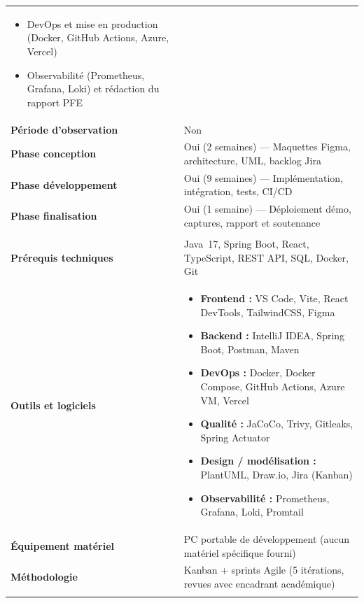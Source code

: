 {\begin{tabularx}{\textwidth}{@{}>{\bfseries\color{ficheblue}}L{4.2cm}X@{}}
\begin{itemize}[leftmargin=1.2em, nosep, topsep=2pt]
\item DevOps et mise en production (Docker, GitHub Actions, Azure, Vercel)
\item Observabilité (Prometheus, Grafana, Loki) et rédaction du rapport PFE
\end{itemize} \\
Période d'observation & Non \\
Phase conception & Oui (2 semaines) --- Maquettes Figma, architecture, UML, backlog Jira \\
Phase développement & Oui (9 semaines) --- Implémentation, intégration, tests, CI/CD \\
Phase finalisation & Oui (1 semaine) --- Déploiement démo, captures, rapport et soutenance \\
\midrule
{}
 \\
\midrule
{}
Prérequis techniques & Java~17, Spring Boot, React, TypeScript, REST API, SQL, Docker, Git \\
Outils et logiciels &
\begin{itemize}[leftmargin=1.2em, nosep, topsep=2pt]
\setlength{\itemsep}{1pt}
\item \textbf{Frontend :} VS Code, Vite, React DevTools, TailwindCSS, Figma
\item \textbf{Backend :} IntelliJ IDEA, Spring Boot, Postman, Maven
\item \textbf{DevOps :} Docker, Docker Compose, GitHub Actions, Azure VM, Vercel
\item \textbf{Qualité :} JaCoCo, Trivy, Gitleaks, Spring Actuator
\item \textbf{Design / modélisation :} PlantUML, Draw.io, Jira (Kanban)
\item \textbf{Observabilité :} Prometheus, Grafana, Loki, Promtail
\end{itemize} \\
Équipement matériel & PC portable de développement (aucun matériel spécifique fourni) \\
Méthodologie & Kanban + sprints Agile (5 itérations, revues avec encadrant académique) \\
\midrule
{}
 \\

\end{tabularx}}
